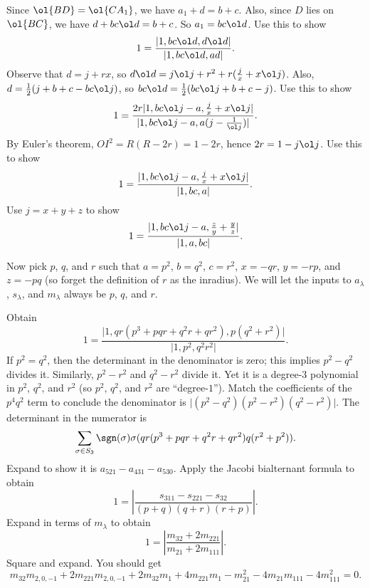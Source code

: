 \documentclass[11pt]{scrartcl}
\begin{document}
\begin{walkthrough}
	\begin{walk}
		\ii Since $\ol{BD} = \ol{CA_1}$, we have $a_1 + d = b + c$. Also, since $D$ lies on $\ol{BC}$, we have $d + bc\ol d = b + c$. So $a_1 = bc\ol d$. Use this to show
		\[1 = \frac{\lvert 1,bc\ol d,d\ol d\rvert}{\lvert 1,bc\ol d,ad\rvert}.\]
		\ii Observe that $d = j + rx$, so $d\ol d = j\ol j + r^2 + r(\frac jx + x\ol j)$. Also, $d = \frac12(j + b + c - bc\ol j)$, so $bc\ol d = \frac12(bc\ol j + b + c - j)$. Use this to show
		\[1 = \frac{2r\lvert 1,bc\ol j - a,\frac jx + x\ol j\rvert}{\lvert1,bc\ol j - a,a(j - \frac1{\ol j})\rvert}.\]
		\ii By Euler's theorem, $OI^2 = R(R - 2r) = 1 - 2r$, hence $2r = 1 - j\ol j$. Use this to show
		\[1 = \frac{\lvert 1,bc\ol j - a,\frac jx + x\ol j\rvert}{\lvert 1,bc,a\rvert}.\]
		\ii Use $j = x + y + z$ to show
		\[1 = \frac{\lvert 1,bc\ol j - a,\frac zy + \frac yz\rvert}{\lvert 1,a,bc\rvert}.\]
	\end{walk}

	Now pick $p$, $q$, and $r$ such that $a = p^2$, $b = q^2$, $c = r^2$, $x = -qr$, $y = -rp$, and $z = -pq$ (so forget the definition of $r$ as the inradius). We will let the inputs to $a_\lambda$, $s_\lambda$, and $m_\lambda$ always be $p$, $q$, and $r$.

	\begin{walk}[resume]
		\ii Obtain
		\[1 = \frac{\lvert 1,qr(p^3 + pqr + q^2r + qr^2),p(q^2 + r^2)\rvert}{\lvert 1,p^2,q^2r^2\rvert}.\]
		\ii If $p^2 = q^2$, then the determinant in the denominator is zero; this implies $p^2 - q^2$ divides it. Similarly, $p^2 - r^2$ and $q^2 - r^2$ divide it. Yet it is a degree-$3$ polynomial in $p^2$, $q^2$, and $r^2$ (so $p^2$, $q^2$, and $r^2$ are ``degree-$1$''). Match the coefficients of the $p^4q^2$ term to conclude the denominator is $\lvert (p^2 - q^2)(p^2 - r^2)(q^2 - r^2)\rvert$.
		\ii The determinant in the numerator is
		\[\sum_{\sigma \in S_3} \sgn(\sigma)\sigma(qr(p^3 + pqr + q^2r + qr^2)q(r^2 + p^2)).\]
		Expand to show it is $a_{521} - a_{431} - a_{530}$.
		\ii Apply the Jacobi bialternant formula to obtain
		\[1 = \left\lvert \frac{s_{311} - s_{221} - s_{32}}{(p + q)(q + r)(r + p)}\right\rvert.\]
		\ii Expand in terms of $m_\lambda$ to obtain
		\[1 = \left\lvert \frac{m_{32} + 2m_{221}}{m_{21} + 2m_{111}}\right\rvert.\]
		Square and expand. You should get
		\[m_{32}m_{2,0,-1} + 2m_{221}m_{2,0,-1} + 2m_{32}m_1 + 4m_{221}m_1 - m_{21}^2 - 4m_{21}m_{111} - 4m_{111}^2 = 0.\]
	\end{walk}


\end{walkthrough}
\end{document}
